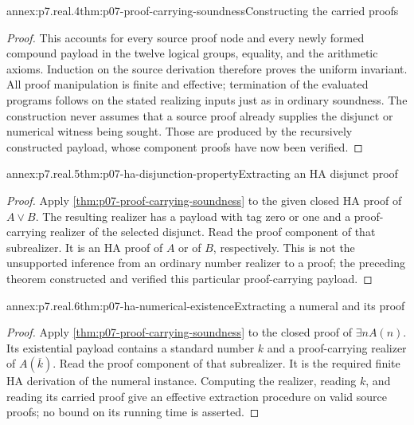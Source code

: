 \begin{annexitem}{annex:p7.real.4}{thm:p07-proof-carrying-soundness}{Constructing the carried proofs}
\begin{proof}
This accounts for every source proof node and every newly formed
compound payload in the twelve logical groups, equality, and the
arithmetic axioms. Induction on the source derivation therefore proves
the uniform invariant. All proof manipulation is finite and effective;
termination of the evaluated programs follows on the stated realizing
inputs just as in ordinary soundness. The construction never assumes
that a source proof already supplies the disjunct or numerical witness
being sought. Those are produced by the recursively constructed
payload, whose component proofs have now been verified.
\end{proof}
\end{annexitem}

\begin{annexitem}{annex:p7.real.5}{thm:p07-ha-disjunction-property}{Extracting an HA disjunct proof}
\begin{proof}
Apply \cref{thm:p07-proof-carrying-soundness} to the given closed
HA proof of \(A\lor B\). The resulting realizer has a payload
with tag zero or one and a proof-carrying realizer of the selected
disjunct. Read the proof component of that subrealizer. It is an HA
proof of \(A\) or of \(B\), respectively. This is not the
unsupported inference from an ordinary number realizer to a proof;
the preceding theorem constructed and verified this particular
proof-carrying payload.
\end{proof}
\end{annexitem}

\begin{annexitem}{annex:p7.real.6}{thm:p07-ha-numerical-existence}{Extracting a numeral and its proof}
\begin{proof}
Apply \cref{thm:p07-proof-carrying-soundness} to the closed proof of
\(\exists nA(n)\). Its existential payload contains a standard
number \(k\) and a proof-carrying realizer of \(A(\overline k)\).
Read the proof component of that subrealizer. It is the required finite
HA derivation of the numeral instance. Computing the realizer, reading
\(k\), and reading its carried proof give an effective extraction
procedure on valid source proofs; no bound on its running time is
asserted.
\end{proof}
\end{annexitem}
